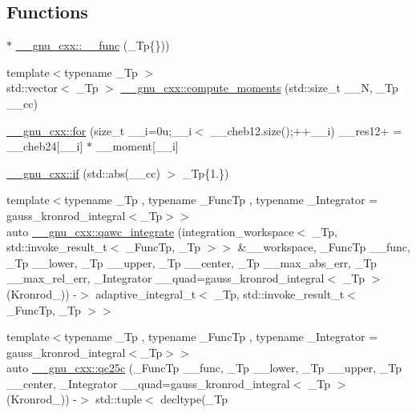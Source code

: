 \subsection*{Functions}
\begin{DoxyCompactItemize}
\item 
$\ast$ \hyperlink{namespace____gnu__cxx_af2b2f0c7a2ae72b922b1afefae5a65b2}{\+\_\+\+\_\+gnu\+\_\+cxx\+::\+\_\+\+\_\+func} (\+\_\+\+Tp\{\}))
\item 
{\footnotesize template$<$typename \+\_\+\+Tp $>$ }\\std\+::vector$<$ \+\_\+\+Tp $>$ \hyperlink{namespace____gnu__cxx_a698ae16aa1c82aa755f3703cc20e2b8e}{\+\_\+\+\_\+gnu\+\_\+cxx\+::compute\+\_\+moments} (std\+::size\+\_\+t \+\_\+\+\_\+N, \+\_\+\+Tp \+\_\+\+\_\+cc)
\item 
\hyperlink{namespace____gnu__cxx_ad851cfdb017da1c6a6466f982d591a52}{\+\_\+\+\_\+gnu\+\_\+cxx\+::for} (size\+\_\+t \+\_\+\+\_\+i=0u;\+\_\+\+\_\+i$<$ \+\_\+\+\_\+cheb12.\+size();++\+\_\+\+\_\+i) \+\_\+\+\_\+res12+ = \+\_\+\+\_\+cheb24\mbox{[}\+\_\+\+\_\+i\mbox{]} $\ast$ \+\_\+\+\_\+moment\mbox{[}\+\_\+\+\_\+i\mbox{]}
\item 
\hyperlink{namespace____gnu__cxx_ad7229840e09434bca7fe1142880bce8b}{\+\_\+\+\_\+gnu\+\_\+cxx\+::if} (std\+::abs(\+\_\+\+\_\+cc) $>$ \+\_\+\+Tp\{1.\})
\item 
{\footnotesize template$<$typename \+\_\+\+Tp , typename \+\_\+\+Func\+Tp , typename \+\_\+\+Integrator  = gauss\+\_\+kronrod\+\_\+integral$<$\+\_\+\+Tp$>$$>$ }\\auto \hyperlink{namespace____gnu__cxx_a2d5a79b861842d746035f4ae626e3056}{\+\_\+\+\_\+gnu\+\_\+cxx\+::qawc\+\_\+integrate} (integration\+\_\+workspace$<$ \+\_\+\+Tp, std\+::invoke\+\_\+result\+\_\+t$<$ \+\_\+\+Func\+Tp, \+\_\+\+Tp $>$$>$ \&\+\_\+\+\_\+workspace, \+\_\+\+Func\+Tp \+\_\+\+\_\+func, \+\_\+\+Tp \+\_\+\+\_\+lower, \+\_\+\+Tp \+\_\+\+\_\+upper, \+\_\+\+Tp \+\_\+\+\_\+center, \+\_\+\+Tp \+\_\+\+\_\+max\+\_\+abs\+\_\+err, \+\_\+\+Tp \+\_\+\+\_\+max\+\_\+rel\+\_\+err, \+\_\+\+Integrator \+\_\+\+\_\+quad=gauss\+\_\+kronrod\+\_\+integral$<$ \+\_\+\+Tp $>$(Kronrod\+\_)) -\/$>$ adaptive\+\_\+integral\+\_\+t$<$ \+\_\+\+Tp, std\+::invoke\+\_\+result\+\_\+t$<$ \+\_\+\+Func\+Tp, \+\_\+\+Tp $>$$>$
\item 
{\footnotesize template$<$typename \+\_\+\+Tp , typename \+\_\+\+Func\+Tp , typename \+\_\+\+Integrator  = gauss\+\_\+kronrod\+\_\+integral$<$\+\_\+\+Tp$>$$>$ }\\auto \hyperlink{namespace____gnu__cxx_a0eeb3014f3114b5d73059433b58fba86}{\+\_\+\+\_\+gnu\+\_\+cxx\+::qc25c} (\+\_\+\+Func\+Tp \+\_\+\+\_\+func, \+\_\+\+Tp \+\_\+\+\_\+lower, \+\_\+\+Tp \+\_\+\+\_\+upper, \+\_\+\+Tp \+\_\+\+\_\+center, \+\_\+\+Integrator \+\_\+\+\_\+quad=gauss\+\_\+kronrod\+\_\+integral$<$ \+\_\+\+Tp $>$(Kronrod\+\_)) -\/$>$ std\+::tuple$<$ decltype(\+\_\+\+Tp
\end{DoxyCompactItemize}
